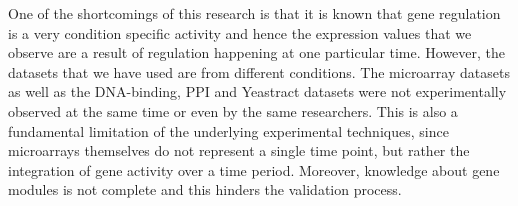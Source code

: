 One of the shortcomings of this research is that it is known that gene regulation is a very condition specific activity and hence the expression values that we observe are a result of regulation happening at one particular time. However, the datasets that we have used are from different conditions. The microarray datasets as well as the DNA-binding, PPI and Yeastract datasets were not experimentally observed at the same time or even by the same researchers. This is also a fundamental limitation of the underlying experimental techniques, since microarrays themselves do not represent a single time point, but rather the integration of gene activity over a time period. Moreover, knowledge about gene modules is not complete and this hinders the validation process. 

